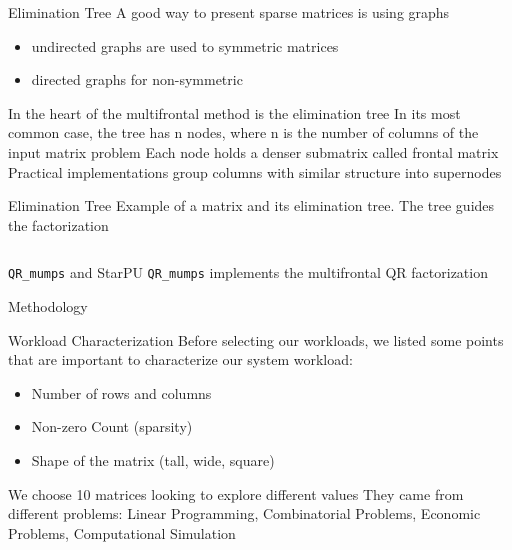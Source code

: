 \documentclass[presentation]{beamer}
\begin{document}
\begin{frame}[label={sec:orgcf1b76c}]{Elimination Tree}
\vfill
A good way to present sparse matrices is using graphs
\begin{itemize}
\item \alert{undirected} graphs are used to \alert{symmetric} matrices
\item \alert{directed} graphs for \alert{non-symmetric}
\end{itemize}
\vfill \pause
In the heart of the multifrontal method is the \alert{elimination tree}
\vfill
In its most common case, the tree has \alert{n} nodes, where n is the number
of columns of the input matrix problem
\vfill
Each node holds a denser submatrix called \alert{frontal matrix}
\vfill
Practical implementations group columns with similar structure into
\alert{supernodes} 
\vfill
\end{frame}
\begin{frame}[label={sec:orgf49f41b}]{Elimination Tree}
Example of a matrix and its elimination tree. The tree guides the
factorization 
\begin{columns}
\begin{column}{0.3\columnwidth}
\begin{center}
\end{center}
\end{column}

\begin{column}{0.3\columnwidth}
\begin{center}
\end{center}
\end{column}
\end{columns}
\end{frame}
\begin{frame}[fragile,label={sec:orgb1800db}]{\texttt{QR\_mumps} and StarPU}
 \texttt{QR\_mumps} implements the multifrontal QR factorization
\begin{block}{}
\begin{center}
\Huge{Methodology}
\end{center}
\end{block}
\end{frame}
\begin{frame}[label={sec:org6435587}]{Workload Characterization}
\vfill
Before selecting our workloads, we listed some points that are
important to characterize our system workload: 
\begin{itemize}
\item Number of \alert{rows} and \alert{columns}
\item Non-zero Count (\alert{sparsity})
\item Shape of the matrix (tall, wide, square)
\end{itemize}
\vfill
We choose 10 matrices looking to explore different values
\vfill
They came from different problems: Linear Programming, Combinatorial
Problems, Economic Problems, Computational Simulation 
\vfill
\end{frame}
\end{document}
